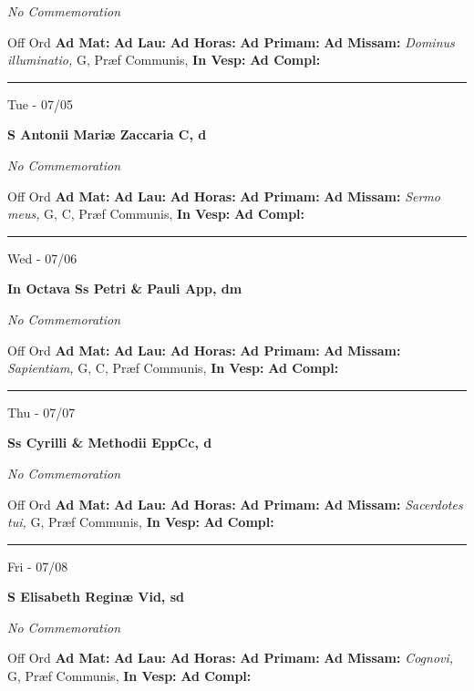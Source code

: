 \documentclass[letterpaper, 10pt]{article}
\begin{document}
\textit{No Commemoration}\begin{justify}
Off Ord
\textbf{Ad Mat: }
\textbf{Ad Lau: }
\textbf{Ad Horas: }
\textbf{Ad Primam: }
\textbf{Ad Missam:} \textit{Dominus illuminatio, } G, Præf Communis, 
\textbf{In Vesp: }
\textbf{Ad Compl: }\end{justify}



\hrule
\begin{center}
Tue - 07/05
\end{center}\textbf{ \large S Antonii Mariæ Zaccaria C, \textnormal{\normalsize d}}

\textit{No Commemoration}\begin{justify}
Off Ord
\textbf{Ad Mat: }
\textbf{Ad Lau: }
\textbf{Ad Horas: }
\textbf{Ad Primam: }
\textbf{Ad Missam:} \textit{Sermo meus, } G, C, Præf Communis, 
\textbf{In Vesp: }
\textbf{Ad Compl: }\end{justify}



\hrule
\begin{center}
Wed - 07/06
\end{center}\textbf{ \large In Octava Ss Petri \& Pauli App, \textnormal{\normalsize dm}}

\textit{No Commemoration}\begin{justify}
Off Ord
\textbf{Ad Mat: }
\textbf{Ad Lau: }
\textbf{Ad Horas: }
\textbf{Ad Primam: }
\textbf{Ad Missam:} \textit{Sapientiam, } G, C, Præf Communis, 
\textbf{In Vesp: }
\textbf{Ad Compl: }\end{justify}



\hrule
\begin{center}
Thu - 07/07
\end{center}\textbf{ \large Ss Cyrilli \& Methodii EppCc, \textnormal{\normalsize d}}

\textit{No Commemoration}\begin{justify}
Off Ord
\textbf{Ad Mat: }
\textbf{Ad Lau: }
\textbf{Ad Horas: }
\textbf{Ad Primam: }
\textbf{Ad Missam:} \textit{Sacerdotes tui, } G, Præf Communis, 
\textbf{In Vesp: }
\textbf{Ad Compl: }\end{justify}



\hrule
\begin{center}
Fri - 07/08
\end{center}\textbf{ \large S Elisabeth Reginæ Vid, \textnormal{\normalsize sd}}

\textit{No Commemoration}\begin{justify}
Off Ord
\textbf{Ad Mat: }
\textbf{Ad Lau: }
\textbf{Ad Horas: }
\textbf{Ad Primam: }
\textbf{Ad Missam:} \textit{Cognovi, } G, Præf Communis, 
\textbf{In Vesp: }
\textbf{Ad Compl: }\end{justify}
\end{document}
